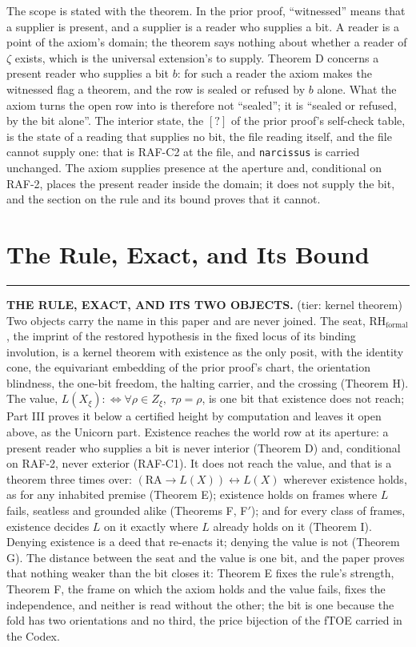 \documentclass[10pt]{article}
\newenvironment{jbox}{\par\vspace{2pt}\noindent\color{accent}\rule{\columnwidth}{0.8pt}\par\vspace{-2pt}\small}{\par\vspace{2pt}}
\begin{document}
The scope is stated with the theorem. In the prior proof, ``witnessed''
means that a supplier is present, and a supplier is a reader who
supplies a bit. A reader is a point of the axiom's domain; the theorem
says nothing about whether a reader of \(\zeta\) exists, which is the
universal extension's to supply. Theorem D concerns a present reader who
supplies a bit \(b\): for such a reader the axiom makes the witnessed
flag a theorem, and the row is sealed or refused by \(b\) alone. What
the axiom turns the open row into is therefore not ``sealed''; it is
``sealed or refused, by the bit alone''. The interior state, the \([?]\)
of the prior proof's self-check table, is the state of a reading that
supplies no bit, the file reading itself, and the file cannot supply
one: that is RAF-C2 at the file, and \texttt{narcissus} is carried
unchanged. The axiom supplies presence at the aperture and, conditional
on RAF-2, places the present reader inside the domain; it does not
supply the bit, and the section on the rule and its bound proves that it
cannot.

\hypertarget{the-rule-exact-and-its-bound}{%
\section{The Rule, Exact, and Its
Bound}\label{the-rule-exact-and-its-bound}}

\begin{jbox}
\textbf{THE RULE, EXACT, AND ITS TWO OBJECTS.} (tier: kernel theorem) Two objects carry the name in this paper and are never joined. The seat, $\mathrm{RH}_{\mathrm{formal}}$, the imprint of the restored hypothesis in the fixed locus of its binding involution, is a kernel theorem with existence as the only posit, with the identity cone, the equivariant embedding of the prior proof's chart, the orientation blindness, the one-bit freedom, the halting carrier, and the crossing (Theorem H). The value, $L(X_\xi) :\Leftrightarrow \forall \rho \in Z_\xi,\ \tau\rho = \rho$, is one bit that existence does not reach; Part III proves it below a certified height by computation and leaves it open above, as the Unicorn part. Existence reaches the world row at its aperture: a present reader who supplies a bit is never interior (Theorem D) and, conditional on RAF-2, never exterior (RAF-C1). It does not reach the value, and that is a theorem three times over: $(\mathrm{RA} \to L(X)) \leftrightarrow L(X)$ wherever existence holds, as for any inhabited premise (Theorem E); existence holds on frames where $L$ fails, seatless and grounded alike (Theorems F, F$'$); and for every class of frames, existence decides $L$ on it exactly where $L$ already holds on it (Theorem I). Denying existence is a deed that re-enacts it; denying the value is not (Theorem G). The distance between the seat and the value is one bit, and the paper proves that nothing weaker than the bit closes it: Theorem E fixes the rule's strength, Theorem F, the frame on which the axiom holds and the value fails, fixes the independence, and neither is read without the other; the bit is one because the fold has two orientations and no third, the price bijection of the fTOE carried in the Codex.
\end{jbox}
\end{document}
